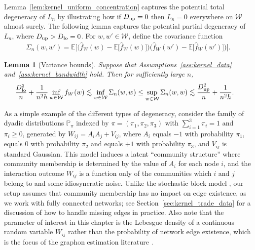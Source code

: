 \documentclass[11pt,lof]{puthesis}
\renewcommand{\P}{\ensuremath{\mathbb{P}}}
\newcommand{\E}{\ensuremath{\mathbb{E}}}
\newcommand{\cW}{\ensuremath{\mathcal{W}}}
\newcommand{\Dl}{\ensuremath{D_{\textup{lo}}}}
\newcommand{\Du}{\ensuremath{D_{\textup{up}}}}
\theoremstyle{break}
\newtheorem{lemma}{Lemma}[section]
\theoremstyle{proof}
\begin{document}
Lemma~\ref{lem:kernel_uniform_concentration} captures the potential total
degeneracy
of $L_n$ by illustrating how if $\Du=0$ then $L_n=0$ everywhere on $\cW$ almost
surely. The following lemma captures the potential partial degeneracy of $L_n$,
where $\Du > \Dl = 0$. For $w,w' \in \cW$, define the covariance function
%
\begin{align*}
\Sigma_n(w,w') =
\E\Big[
\Big(
\hat f_W(w)
- \E\big[\hat f_W(w)\big]
\Big)
\Big(
\hat f_W(w')
- \E\big[\hat f_W(w')\big]
\Big)
\Big].
\end{align*}
%
\begin{lemma}[Variance bounds]
\label{lem:kernel_variance_bounds}
Suppose that Assumptions~\ref{ass:kernel_data} and~\ref{ass:kernel_bandwidth}
hold. Then for sufficiently large $n$,
%
\begin{align*}
\frac{\Dl^2}{n} + \frac{1}{n^2h}
\inf_{w \in \cW} f_W(w)
&\lesssim
\inf_{w \in \cW} \Sigma_n(w,w)
\leq
\sup_{w \in \cW} \Sigma_n(w,w)
\lesssim
\frac{\Du^2}{n} + \frac{1}{n^2h}.
\end{align*}
%
\end{lemma}

As a simple example of the different types of degeneracy, consider the family
of dyadic distributions $\P_{\pi}$ indexed by $\pi = (\pi_1, \pi_2, \pi_3)$
with $\sum_{i=1}^3 \pi_i = 1$ and $\pi_i \geq 0$, generated by
$W_{i j} = A_i A_j + V_{i j}$, where $A_i$ equals $-1$ with probability
$\pi_1$, equals $0$ with probability $\pi_2$ and equals $+1$ with probability
$\pi_3$, and $V_{i j}$ is standard Gaussian. This model induces a latent
``community structure'' where community membership is determined by the value
of $A_i$ for each node $i$, and the interaction outcome $W_{i j}$ is a function
only of the communities which $i$ and $j$ belong to and some idiosyncratic
noise. Unlike the stochastic block model \citep{kolaczyk2009statistical}, our
setup assumes that community membership has no impact on edge existence, as we
work with fully connected networks; see Section~\ref{sec:kernel_trade_data} for
a
discussion of how to handle missing edges in practice. Also note that the
parameter of interest in this chapter is the Lebesgue density of a continuous
random variable $W_{i j}$ rather than the probability of network edge
existence, which is the focus of the graphon estimation literature
\citep{gao2021minimax}.
\end{document}
